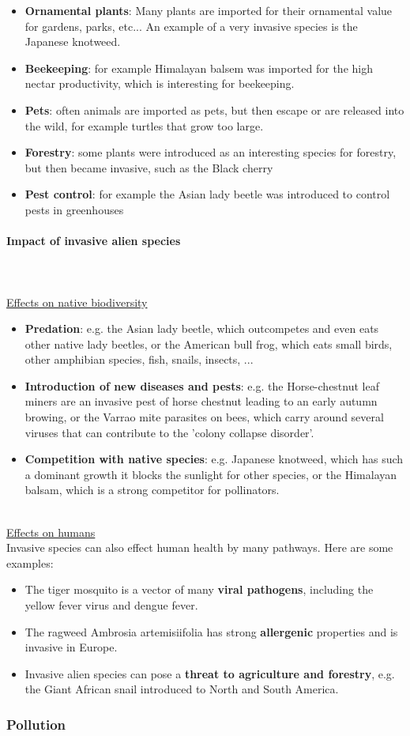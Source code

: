 \documentclass[../summary.tex]{subfiles}
\begin{document}
\begin{itemize}
	\item \textbf{Ornamental plants}: Many plants are imported for their ornamental value for gardens, parks, etc... An example of a very invasive species is the Japanese knotweed.
	\item \textbf{Beekeeping}: for example Himalayan balsem was imported for the high nectar productivity, which is interesting for beekeeping.
	\item \textbf{Pets}: often animals are imported as pets, but then escape or are released into the wild, for example turtles that grow too large. 
	\item \textbf{Forestry}: some plants were introduced as an interesting species for forestry, but then became invasive, such as the Black cherry
	\item \textbf{Pest control}: for example the Asian lady beetle was introduced to control pests in greenhouses
\end{itemize}

\paragraph{Impact of invasive alien species}
 \ \\\\
\underline{Effects on native biodiversity}\\
\begin{itemize}
	\item \textbf{Predation}: e.g. the Asian lady beetle, which outcompetes and even eats other native lady beetles, or the American bull frog, which eats small birds, other amphibian species, fish, snails, insects, ...
	\item \textbf{Introduction of new diseases and pests}: e.g. the Horse-chestnut leaf miners are an invasive pest of horse chestnut leading to an early autumn browing, or the Varrao mite parasites on bees, which carry around several viruses that can contribute to the 'colony collapse disorder'.
	\item \textbf{Competition with native species}: e.g. Japanese knotweed, which has such a dominant growth it blocks the sunlight for other species, or the Himalayan balsam, which is a strong competitor for pollinators.
\end{itemize}
\ \\
\underline{Effects on humans}\\
Invasive species can also effect human health by many pathways. Here are some examples:
\begin{itemize}
	\item The tiger mosquito is a vector of many \textbf{viral pathogens}, including the yellow fever virus and dengue fever.
	\item The ragweed Ambrosia artemisiifolia has strong \textbf{allergenic} properties and is invasive in Europe. 
	\item Invasive alien species can pose a \textbf{threat to agriculture and forestry}, e.g. the Giant African snail introduced to North and South America.
\end{itemize}

\subsubsection{Pollution}
\end{document}
